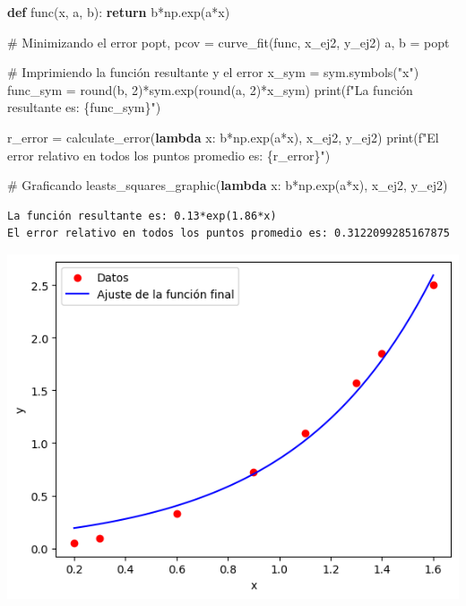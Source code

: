 \documentclass[
  letterpaper,
  DIV=11,
  numbers=noendperiod]{scrartcl}
\newenvironment{Shaded}{\begin{snugshade}}{\end{snugshade}}
\newcommand{\BuiltInTok}[1]{\textcolor[rgb]{0.00,0.23,0.31}{#1}}
\newcommand{\CommentTok}[1]{\textcolor[rgb]{0.37,0.37,0.37}{#1}}
\newcommand{\ControlFlowTok}[1]{\textcolor[rgb]{0.00,0.23,0.31}{\textbf{#1}}}
\newcommand{\DecValTok}[1]{\textcolor[rgb]{0.68,0.00,0.00}{#1}}
\newcommand{\KeywordTok}[1]{\textcolor[rgb]{0.00,0.23,0.31}{\textbf{#1}}}
\newcommand{\NormalTok}[1]{\textcolor[rgb]{0.00,0.23,0.31}{#1}}
\newcommand{\OperatorTok}[1]{\textcolor[rgb]{0.37,0.37,0.37}{#1}}
\newcommand{\SpecialCharTok}[1]{\textcolor[rgb]{0.37,0.37,0.37}{#1}}
\newcommand{\SpecialStringTok}[1]{\textcolor[rgb]{0.13,0.47,0.30}{#1}}
\newcommand{\StringTok}[1]{\textcolor[rgb]{0.13,0.47,0.30}{#1}}
\begin{document}
\begin{Shaded}
\begin{Highlighting}[]

\KeywordTok{def}\NormalTok{ func(x, a, b):}
    \ControlFlowTok{return}\NormalTok{ b}\OperatorTok{*}\NormalTok{np.exp(a}\OperatorTok{*}\NormalTok{x)}

\CommentTok{\# Minimizando el error}
\NormalTok{popt, pcov }\OperatorTok{=}\NormalTok{ curve\_fit(func, x\_ej2, y\_ej2)}
\NormalTok{a, b }\OperatorTok{=}\NormalTok{ popt}

\CommentTok{\# Imprimiendo la función resultante y el error}
\NormalTok{x\_sym }\OperatorTok{=}\NormalTok{ sym.symbols(}\StringTok{"x"}\NormalTok{)}
\NormalTok{func\_sym }\OperatorTok{=} \BuiltInTok{round}\NormalTok{(b, }\DecValTok{2}\NormalTok{)}\OperatorTok{*}\NormalTok{sym.exp(}\BuiltInTok{round}\NormalTok{(a, }\DecValTok{2}\NormalTok{)}\OperatorTok{*}\NormalTok{x\_sym)}
\BuiltInTok{print}\NormalTok{(}\SpecialStringTok{f"La función resultante es: }\SpecialCharTok{\{}\NormalTok{func\_sym}\SpecialCharTok{\}}\SpecialStringTok{"}\NormalTok{)}

\NormalTok{r\_error }\OperatorTok{=}\NormalTok{ calculate\_error(}\KeywordTok{lambda}\NormalTok{ x: b}\OperatorTok{*}\NormalTok{np.exp(a}\OperatorTok{*}\NormalTok{x), x\_ej2, y\_ej2)}
\BuiltInTok{print}\NormalTok{(}\SpecialStringTok{f"El error relativo en todos los puntos promedio es: }\SpecialCharTok{\{}\NormalTok{r\_error}\SpecialCharTok{\}}\SpecialStringTok{"}\NormalTok{)}

\CommentTok{\# Graficando}
\NormalTok{leasts\_squares\_graphic(}\KeywordTok{lambda}\NormalTok{ x: b}\OperatorTok{*}\NormalTok{np.exp(a}\OperatorTok{*}\NormalTok{x), x\_ej2, y\_ej2)}
\end{Highlighting}
\end{Shaded}

\begin{verbatim}
La función resultante es: 0.13*exp(1.86*x)
El error relativo en todos los puntos promedio es: 0.3122099285167875
\end{verbatim}

\includegraphics{Tarea8_MN_files/figure-pdf/cell-13-output-2.png}
\end{document}
